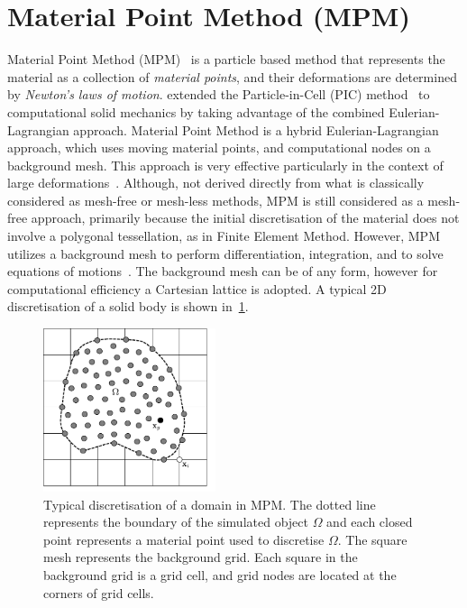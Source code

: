 \section{Material Point Method (MPM)}
Material Point Method (MPM)~\citep{Sulsky1994,Sulsky1995} is a particle based 
method that represents the material as a collection of \textit{material 
points}, and their deformations are determined by \textit{Newton's laws of 
motion}. \citet{Sulsky1994} extended the Particle-in-Cell (PIC) 
method~\citep{Harlow1964} to computational solid mechanics by taking advantage 
of the combined Eulerian-Lagrangian approach. Material Point Method is a hybrid 
Eulerian-Lagrangian approach, which uses moving material points, and 
computational nodes on a background mesh. This approach is very effective 
particularly in the context of large 
deformations~\citep{Mackenzie-Helnwein2010,Shin2010a,Mast2014,Andersen2010,Zhang2009,Bandara2013}.
Although, not derived directly from what is classically considered as mesh-free 
or mesh-less methods, MPM is still considered as a mesh-free approach, 
primarily because the initial discretisation of the material does not involve a 
polygonal tessellation, as in Finite Element Method. However, MPM utilizes a 
background mesh to perform differentiation, integration, and to solve equations 
of motions~\citep{Steffen2008}. The background mesh can be of any form, however 
for computational efficiency a Cartesian lattice is adopted. A typical 2D 
discretisation of a solid body is shown in~\cref{fig:MPM}. 

\begin{figure}[tbhp]
\centering
\includegraphics[width=0.45\textwidth]{MPM}
\caption[Typical discretisation of a domain in MPM]{Typical discretisation of a 
domain in MPM. The dotted line represents the boundary of the simulated object 
$\Omega$ and each closed point represents a material point used to discretise 
$\Omega$. The square mesh represents the background grid. Each square in the 
background grid is a grid cell, and grid nodes are located at the corners of 
grid cells.}
\label{fig:MPM}
\end{figure}

